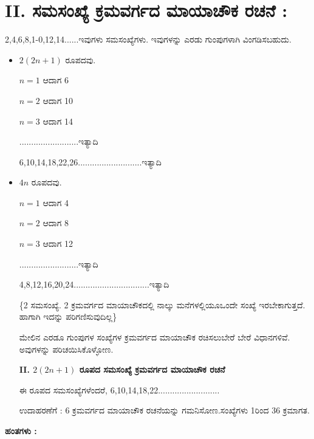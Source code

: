 \section*{II. ಸಮಸಂಖ್ಯೆ ಕ್ರಮವರ್ಗದ ಮಾಯಾಚೌಕ ರಚನೆ :}

2,4,6,8,1-0,12,14......ಇವುಗಳು ಸಮಸಂಖ್ಯೆಗಳು. ಇವುಗಳನ್ನು ಎರಡು ಗುಂಪು\-ಗಳಾಗಿ ವಿಂಗಡಿಸಬಹುದು.

\begin{itemize}
	\item $2 (2n+1)$ ರೂಪದವು.

	$n=1$ ಆದಾಗ 6

	$n=2$ ಆದಾಗ 10

	$n=3$ ಆದಾಗ 14

	.........................ಇತ್ಯಾದಿ

	6,10,14,18,22,26...........................ಇತ್ಯಾದಿ
	\item $4n$ ರೂಪದವು. 

	$n=1$ ಆದಾಗ 4

	$n=2$ ಆದಾಗ 8

	$n=3$ ಆದಾಗ 12

	.........................ಇತ್ಯಾದಿ

	4,8,12,16,20,24................................ಇತ್ಯಾದಿ

	\{2 ಸಮಸಂಖ್ಯೆ. 2 ಕ್ರಮವರ್ಗದ ಮಾಯಾಚೌಕದಲ್ಲಿ ನಾಲ್ಕು ಮನೆಗಳಲ್ಲಿಯೂ\break ಒಂದೇ ಸಂಖ್ಯೆ ಇರಬೇಕಾಗುತ್ತದೆ. ಹಾಗಾಗಿ ಇದನ್ನು ಪರಿಗಣಿಸುವುದಿಲ್ಲ\}

	ಮೇಲಿನ ಎರಡೂ ಗುಂಪುಗಳ ಸಂಖ್ಯೆಗಳ ಕ್ರಮವರ್ಗದ ಮಾಯಾಚೌಕ ರಚಿಸಲು\break ಬೇರೆ ಬೇರೆ ವಿಧಾನಗಳಿವೆ. ಅವುಗಳನ್ನು ಪರಿಚಯಿಸಿಕೊಳ್ಳೋಣ.

\smallskip
	\textbf{II. $2 (2n+1)$ ರೂಪದ ಸಮಸಂಖ್ಯೆ  ಕ್ರಮವರ್ಗದ ಮಾಯಾಚೌಕ ರಚನೆ}
\smallskip

	ಈ ರೂಪದ ಸಮಸಂಖ್ಯೆಗಳೆಂದರೆ, 6,10,14,18,22..........................

	ಉದಾಹರಣೆಗೆ : 6 ಕ್ರಮವರ್ಗದ ಮಾಯಾಚೌಕ ರಚನೆಯನ್ನು ಗಮನಿಸೋಣ.\break ಸಂಖ್ಯೆಗಳು 1ರಿಂದ 36 ಕ್ರಮಾಗತ.
\end{itemize}

\textbf{ಹಂತಗಳು :}

